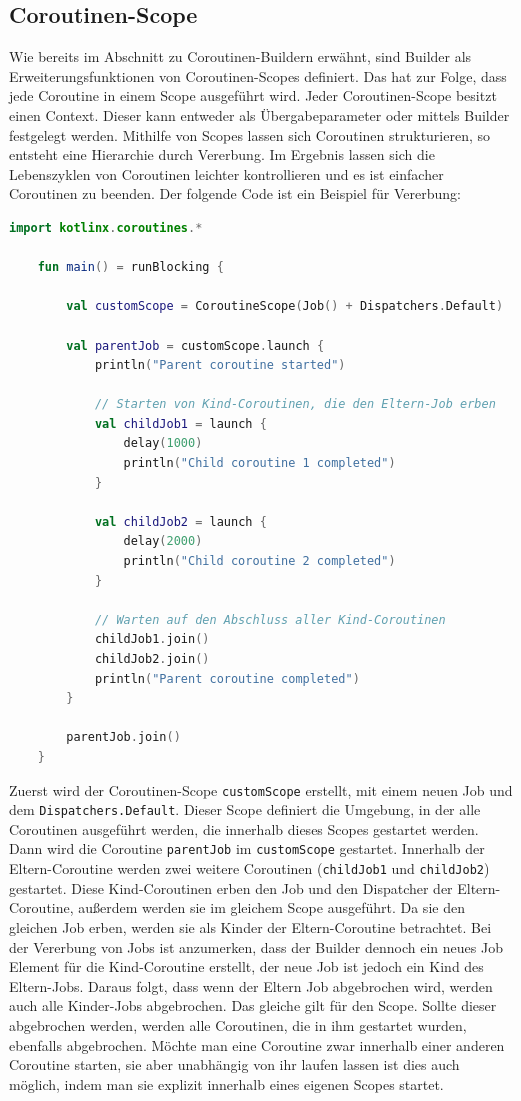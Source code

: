 \documentclass[fontsize=12pt,paper=a4,twoside=semi,parskip=half-,headsepline,headinclude]{scrreprt}
\begin{document}
\subsection{Coroutinen-Scope}
\label{subsec:coroutinescope}

Wie bereits im Abschnitt zu Coroutinen-Buildern erwähnt, sind Builder als  Erweiterungsfunktionen von Coroutinen-Scopes definiert. Das hat zur Folge, dass jede Coroutine in einem Scope ausgeführt wird. Jeder Coroutinen-Scope besitzt einen Context. Dieser kann entweder als Übergabeparameter oder mittels Builder festgelegt werden. Mithilfe von Scopes lassen sich Coroutinen strukturieren, so entsteht eine Hierarchie durch Vererbung. Im Ergebnis lassen sich die Lebenszyklen von Coroutinen leichter kontrollieren und es ist einfacher Coroutinen zu beenden. Der folgende Code ist ein Beispiel für Vererbung:

\begin{lstlisting}[language=Kotlin]
	import kotlinx.coroutines.*

	fun main() = runBlocking {
	
    	val customScope = CoroutineScope(Job() + Dispatchers.Default)

		val parentJob = customScope.launch {
			println("Parent coroutine started")
			
			// Starten von Kind-Coroutinen, die den Eltern-Job erben
			val childJob1 = launch {
				delay(1000)
				println("Child coroutine 1 completed")
			}
		
			val childJob2 = launch {
				delay(2000)
				println("Child coroutine 2 completed")
			}
		
			// Warten auf den Abschluss aller Kind-Coroutinen
			childJob1.join()
			childJob2.join()
			println("Parent coroutine completed")
		}
	
		parentJob.join()
	}
\end{lstlisting}

Zuerst wird der Coroutinen-Scope \texttt{customScope} erstellt, mit einem neuen Job und dem \texttt{Dispatchers.Default}. Dieser Scope definiert die Umgebung, in der alle Coroutinen ausgeführt werden, die innerhalb dieses Scopes gestartet werden. Dann wird die Coroutine \texttt{parentJob} im \texttt{customScope} gestartet. Innerhalb der Eltern-Coroutine werden zwei weitere Coroutinen (\texttt{childJob1} und \texttt{childJob2}) gestartet. Diese Kind-Coroutinen erben den Job und den Dispatcher der Eltern-Coroutine, außerdem werden sie im gleichem Scope ausgeführt. Da sie den gleichen Job erben, werden sie als Kinder der Eltern-Coroutine betrachtet. Bei der Vererbung von Jobs ist anzumerken, dass der Builder dennoch ein neues Job Element für die Kind-Coroutine erstellt, der neue Job ist jedoch ein Kind des Eltern-Jobs. Daraus folgt, dass wenn der Eltern Job abgebrochen wird, werden auch alle Kinder-Jobs abgebrochen. Das gleiche gilt für den Scope.  Sollte dieser abgebrochen werden, werden alle Coroutinen, die in ihm gestartet wurden, ebenfalls abgebrochen. Möchte man eine Coroutine zwar innerhalb einer anderen Coroutine starten, sie aber unabhängig von ihr laufen lassen ist dies auch möglich, indem man sie explizit innerhalb eines eigenen Scopes startet.
\end{document}
